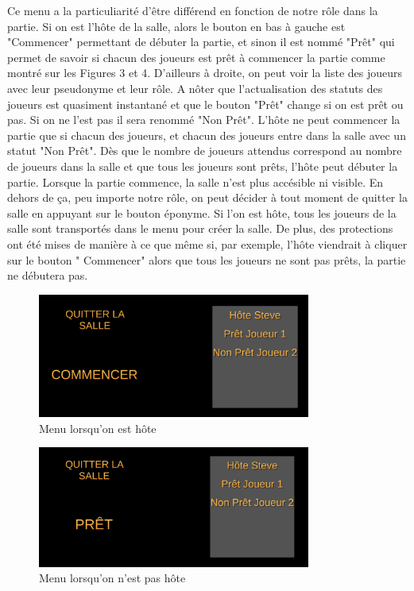 \documentclass{article}
\begin{document}
Ce menu a la particuliarité d'être différend en fonction de notre rôle dans la partie. Si on est l'hôte de la salle, alors le bouton en bas à gauche est "Commencer" permettant de débuter la partie, et sinon il est nommé "Prêt" qui permet de savoir si chacun des joueurs est prêt à commencer la partie comme montré sur les Figures 3 et 4. D'ailleurs à droite, on peut voir la liste des joueurs avec leur pseudonyme et leur rôle. A nôter que l'actualisation des statuts des joueurs est quasiment instantané et que le bouton "Prêt" change si on est prêt ou pas. Si on ne l'est pas il sera renommé "Non Prêt". L'hôte ne peut commencer la partie que si chacun des joueurs, et chacun des joueurs entre dans la salle avec un statut "Non Prêt". Dès que le nombre de joueurs attendus correspond au nombre de joueurs dans la salle et que tous les joueurs sont prêts, l'hôte peut débuter la partie. Lorsque la partie commence, la salle n'est plus accésible ni visible. En dehors de ça, peu importe notre rôle, on peut décider à tout moment de quitter la salle en appuyant sur le bouton éponyme. Si l'on est hôte, tous les joueurs de la salle sont transportés dans le menu pour créer la salle. De plus, des protections ont été mises de manière à ce que même si, par exemple, l'hôte viendrait à cliquer sur le bouton "	Commencer" alors que tous les joueurs ne sont pas prêts, la partie ne débutera pas.

\newpage
\begin{figure}[!ht]
    \centering
    \includegraphics[width=0.8\textwidth]{Menu31.png}
    \caption{Menu lorsqu'on est hôte}
    \label{Menu lorsqu'on est hôte}
\end{figure}



\begin{figure}[!ht]
    \centering
    \includegraphics[width=0.8\textwidth]{Menu32.png}
    \caption{Menu lorsqu'on n'est pas hôte}
    \label{Menu lorsqu'on n'est pas hôte}
\end{figure}
\end{document}
